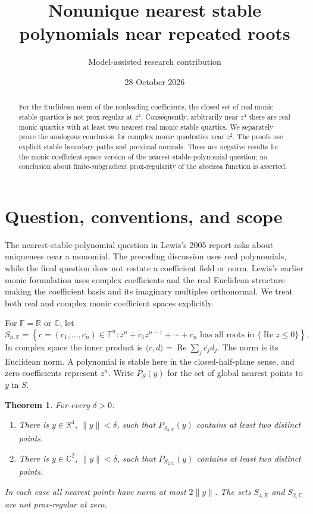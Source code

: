 \documentclass[11pt]{article}
\title{Nonunique nearest stable polynomials near repeated roots}
\author{Model-assisted research contribution}
\date{28 October 2026}
\newtheorem{theorem}{Theorem}
\newcommand{\R}{\mathbb R}
\newcommand{\C}{\mathbb C}
\newcommand{\ip}[2]{\langle #1,#2\rangle}
\newcommand{\norm}[1]{\lVert #1\rVert}
\begin{document}
\maketitle

\begin{abstract}
For the Euclidean norm of the nonleading coefficients, the closed set of real monic stable quartics is not prox-regular at \(z^4\). Consequently, arbitrarily near \(z^4\) there are real monic quartics with at least two nearest real monic stable quartics. We separately prove the analogous conclusion for complex monic quadratics near \(z^2\). The proofs use explicit stable boundary paths and proximal normals. These are negative results for the monic coefficient-space version of the nearest-stable-polynomial question; no conclusion about finite-subgradient prox-regularity of the abscissa function is asserted.
\end{abstract}

\section{Question, conventions, and scope}

The nearest-stable-polynomial question in Lewis's 2005 report \cite[p.~106, Question~1]{owr} asks about uniqueness near a monomial. The preceding discussion uses real polynomials, while the final question does not restate a coefficient field or norm. Lewis's earlier monic formulation \cite[Section~8]{lewis} uses complex coefficients and the real Euclidean structure making the coefficient basis and its imaginary multiples orthonormal. We treat both real and complex monic coefficient spaces explicitly.

For \(\mathbb F=\R\) or \(\C\), let
\[
 S_{n,\mathbb F}
 =\left\{c=(c_1,\ldots,c_n)\in\mathbb F^n:
       z^n+c_1z^{n-1}+\cdots+c_n
       \text{ has all roots in }\{\operatorname{Re}z\leq0\}\right\}.
\]
In complex space the inner product is
\(\ip{c}{d}=\operatorname{Re}\sum_j\overline{c_j}d_j\).
The norm is its Euclidean norm. A polynomial is stable here in the closed-half-plane sense, and zero coefficients represent \(z^n\). Write \(P_S(y)\) for the set of global nearest points to \(y\) in \(S\).

\begin{theorem}\label{thm:main}
For every \(\delta>0\):
\begin{enumerate}
\item There is \(y\in\R^4\), \(\norm{y}<\delta\), such that
      \(P_{S_{4,\R}}(y)\) contains at least two distinct points.
\item There is \(y\in\C^2\), \(\norm{y}<\delta\), such that
      \(P_{S_{2,\C}}(y)\) contains at least two distinct points.
\end{enumerate}
In each case all nearest points have norm at most \(2\norm{y}\).
The sets \(S_{4,\R}\) and \(S_{2,\C}\) are not prox-regular at zero.
\end{theorem}
\end{document}
